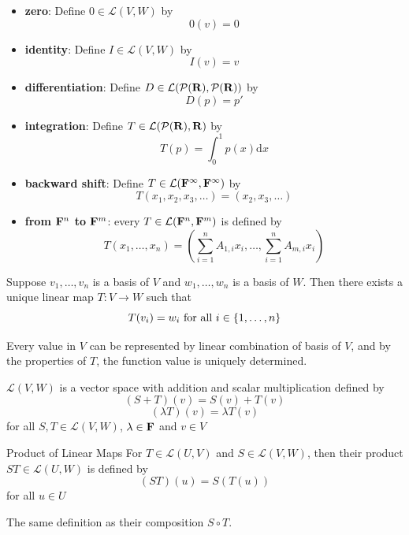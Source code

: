 \documentclass[12pt,a4paper]{article}
\begin{document}
    \begin{eg}
        \hfill
        \begin{itemize}
            \item \textbf{zero}: Define $0\in\mathcal{L}(V,W)$ by
            $$
            0(v)=0
            $$
            \item \textbf{identity}: Define $I\in\mathcal{L}(V,W)$ by
            $$
            I(v)=v
            $$
            \item \textbf{differentiation}: Define $D\in\mathcal{L}(\mathcal{P}(\mathbf{R}),\mathcal{P}(\mathbf{R}))$ by
            $$
            D(p)=p'
            $$
            \item \textbf{integration}: Define $T\in\mathcal{L}(\mathcal{P}(\mathbf{R}),\mathbf{R})$ by
            $$
            T(p)=\int_0^1p(x)\mathrm{d}x
            $$
            \item \textbf{backward shift}: Define $T\in\mathcal{L}(\mathbf{F}^\infty,\mathbf{F}^\infty)$ by
            $$
            T(x_1,x_2,x_3,\dots)=(x_2,x_3,\dots)
            $$
            \item \textbf{from $\mathbf{F}^n$ to $\mathbf{F}^m$}:
            every $T\in\mathcal{L}(\mathbf{F}^n,\mathbf{F}^m)$ is defined by
            $$
            T(x_1,\dots,x_n)=(\sum_{i=1}^nA_{1,i}x_i,\dots,\sum_{i=1}^nA_{m,i}x_i)
            $$
        \end{itemize}
    \end{eg}
    \hfill

    \begin{prop}
        Suppose $v_1,\dots,v_n$ is a basis of $V$ and $w_1,\dots,w_n$ is a basis of $W$. Then there exists a unique linear map $T:V\to W$ such that
        $$
        T(v_i)=w_i\text{ for all }i\in\left\{1,\dots,n\right\}
        $$
    \end{prop}
    \begin{remark}
        Every value in $V$ can be represented by linear combination of basis of $V$, and by the properties of $T$, the function value is uniquely determined.
    \end{remark}
    \hfill

    \begin{prop}
        $\mathcal{L}(V,W)$ is a vector space with addition and scalar multiplication defined by 
        $$(S+T)(v)=S(v)+T(v)$$
        $$(\lambda T)(v)=\lambda T(v)$$
        for all $S,T\in\mathcal{L}(V,W)$, $\lambda\in\mathbf{F}$ and $v\in V$
    \end{prop}
    \hfill

    \begin{defi}{Product of Linear Maps}
        For $T\in\mathcal{L}(U,V)$ and $S\in\mathcal{L}(V,W)$, then their product $ST\in\mathcal{L}(U,W)$ is defined by
        $$(ST)(u)=S(T(u))$$
        for all $u\in U$
    \end{defi}
    \begin{remark}
        The same definition as their composition $S\circ T$.
    \end{remark}
    \hfill
\end{document}
